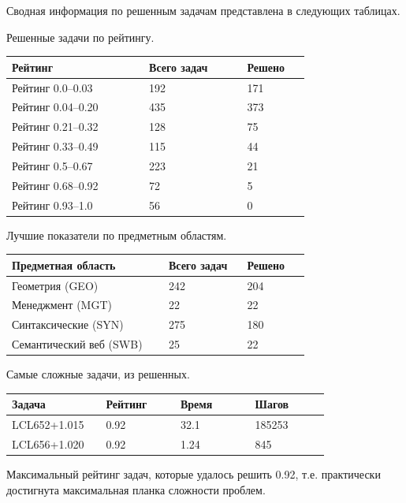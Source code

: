 \documentclass[a4paper]{report}
\begin{document}
Сводная информация по решенным задачам представлена в следующих таблицах.

Решенные задачи по рейтингу.

\begin{longtable}[H]{|p{0.35\linewidth}|p{0.25\linewidth}|p{0.15\linewidth}|}
\hline
\textbf{Рейтинг} & \textbf{Всего задач} & \textbf{Решено} \\
\hline
Рейтинг 0.0--0.03 & 192 & 171 \\
\hline
Рейтинг 0.04--0.20 & 435 & 373 \\
\hline
Рейтинг 0.21--0.32 & 128 & 75 \\
\hline
Рейтинг 0.33--0.49 & 115 & 44 \\
\hline
Рейтинг 0.5--0.67 & 223 & 21 \\
\hline
Рейтинг 0.68--0.92 & 72 & 5 \\
\hline
Рейтинг 0.93--1.0 & 56 & 0\\
\hline
\end{longtable}


Лучшие показатели по предметным областям.

\begin{longtable}[H]{|p{0.4\linewidth}|p{0.2\linewidth}|p{0.15\linewidth}|}
\hline
\textbf{Предметная область} & \textbf{Всего задач} & \textbf{Решено} \\
\hline
Геометрия (GEO) & 242 & 204 \\
\hline
Менеджмент (MGT) & 22 & 22 \\
\hline
Синтаксические (SYN) & 275 & 180 \\
\hline
Семантический веб (SWB) & 25 & 22 \\
\hline
\end{longtable}


Самые сложные задачи, из решенных.

\begin{longtable}[H]{|p{0.2\linewidth}|p{0.2\linewidth}|p{0.2\linewidth}|p{0.2\linewidth}|}
\hline
\textbf{Задача} & \textbf{Рейтинг} & \textbf{Время} & \textbf{Шагов} \\
\hline 
LCL652+1.015 & 0.92 & 32.1 & 185253 \\
\hline
LCL656+1.020 & 0.92 & 1.24 & 845 \\
\hline
\end{longtable}


Максимальный рейтинг задач, которые удалось решить 0.92, т.е. практически достигнута максимальная планка сложности проблем. 
\end{document}
